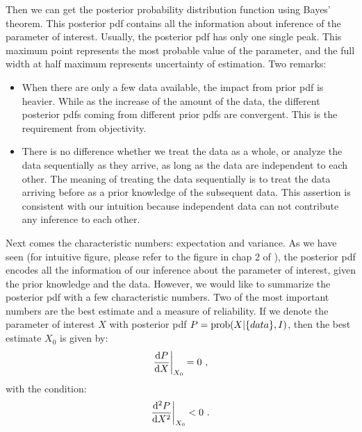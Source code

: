 \documentclass[11pt, a4paper]{article}
\begin{document}
Then we can get the posterior probability distribution function using Bayes' theorem. This posterior pdf contains all the information about inference of the parameter of interest. Usually, the posterior pdf has only one single peak. This maximum point represents the most probable value of the parameter, and the full width at half maximum represents uncertainty of estimation. Two remarks:
\begin{itemize}
\item When there are only a few data available, the impact from prior pdf is heavier. While as the increase of the amount of the data, the different posterior pdfs coming from different prior pdfs are convergent. This is the requirement from objectivity.
\item  There is no difference whether we treat the data as a whole, or analyze the data sequentially as they arrive, as long as the data are independent to each other. The meaning of treating the data sequentially is to treat the data arriving before as a prior knowledge of the subsequent data. This assertion is consistent with our intuition because independent data can not contribute any inference to each other.
\end{itemize}

Next comes the characteristic numbers: expectation and variance. As we have seen (for intuitive figure, please refer to the figure in chap 2 of \cite{book:sivia}), the posterior pdf encodes all the information of our inference about the parameter of interest,  given the prior knowledge and the data. However, we would like to summarize the posterior pdf with a few characteristic numbers. Two of the most important numbers are the best estimate and a measure of reliability. If we denote the parameter of interest $X$ with posterior pdf $P={\rm prob}(X|\{data\},I)$, then the best estimate 
$X_0$ is given by:
\begin{equation}\label{mono}
\frac{{\rm d}P}{{\rm d}X}\bigg |_{X_0}=0~,
\end{equation}
with the condition:
\begin{equation}
\frac{{\rm d}^2 P}{{\rm d} X^2} \bigg |_{X_0}<0~.
\end{equation}
\end{document}
